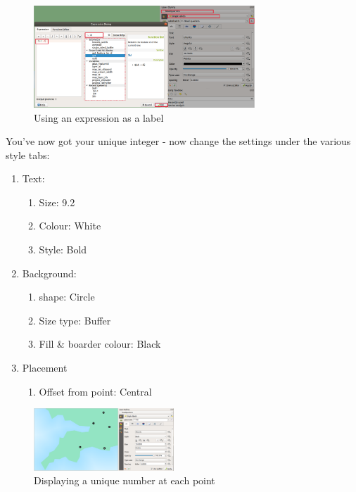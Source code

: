 \begin{enumerate}[~~~1)]
\begin{figure}[!h]
	\centering
	\includegraphics[width=0.74\textwidth]{images/label_with_expression.png}
	\caption{Using an expression as a label}
	\label{ft_fig_firstfig3}
\end{figure}

\end{enumerate}

You've now got your unique integer - now change the settings under the various style tabs:

\begin{enumerate}[~~~1)]
	\item
	Text:
	\begin{enumerate}[~~~1)]
		\item
		Size: 9.2
		\item
		Colour: White
		\item
		Style: Bold
	\end{enumerate}
	
	\item
	Background: 
	\begin{enumerate}[~~~1)]
		\item
		shape: Circle
		\item
		Size type: Buffer
		\item
		Fill \& boarder colour: Black
	\end{enumerate}
	
	\item
	Placement
	\begin{enumerate}[~~~1)]
		\item
		Offset from point: Central
	\end{enumerate}
\end{enumerate}

\begin{figure}[!h]
	\centering
	\includegraphics[width=0.47\textwidth]{images/number_in_point2.png}
	\caption{Displaying a unique number at each point}
	\label{ft_fig_firstfig3}
\end{figure}
